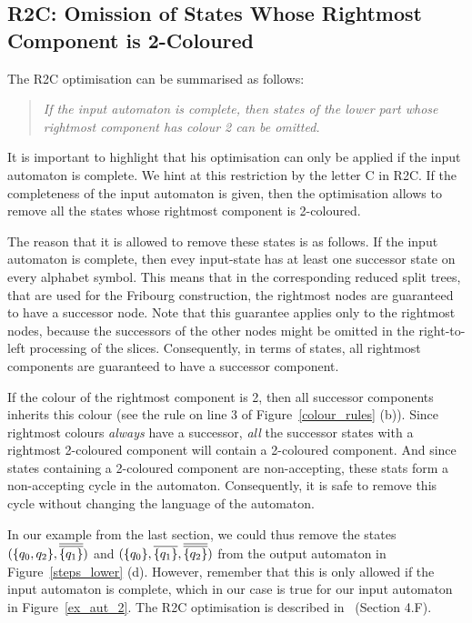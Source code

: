 \subsection{R2C: Omission of States Whose Rightmost Component is 2-Coloured}

The R2C optimisation can be summarised as follows:

\begin{quote}
\centering
\textit{If the input automaton is complete, then states of the lower part whose\\rightmost component has colour 2 can be omitted.}
\end{quote}

It is important to highlight that his optimisation can only be applied if the input automaton is complete. We hint at this restriction by the letter C in R2C. If the completeness of the input automaton is given, then the optimisation allows to remove all the states whose rightmost component is 2-coloured. 

The reason that it is allowed to remove these states is as follows. If the input automaton is complete, then evey input-state has at least one successor state on every alphabet symbol. This means that in the corresponding reduced split trees, that are used for the Fribourg construction, the rightmost nodes are guaranteed to have a successor node. Note that this guarantee applies only to the rightmost nodes, because the successors of the other nodes might be omitted in the right-to-left processing of the slices. Consequently, in terms of states, all rightmost components are guaranteed to have a successor component. 

If the colour of the rightmost component is 2, then all successor components inherits this colour (see the rule on line 3 of Figure~\ref{colour_rules} (b)). Since rightmost colours \textit{always} have a successor, \textit{all} the successor states with a rightmost 2-coloured component will contain a 2-coloured component. And since states containing a 2-coloured component are non-accepting, these stats form a non-accepting cycle in the automaton. Consequently, it is safe to remove this cycle without changing the language of the automaton.

In our example from the last section, we could thus remove the states $(\qqm02, \cl2{\qm1})$ and $(\qm0, \cl1{\qm1}, \cl2{\qm2})$ from the output automaton in Figure~\ref{steps_lower} (d). However, remember that this is only allowed if the input automaton is complete, which in our case is true for our input automaton in Figure~\ref{ex_aut_2}. The R2C optimisation is described in~\cite{2014_joel_ulrich} (Section 4.F).


